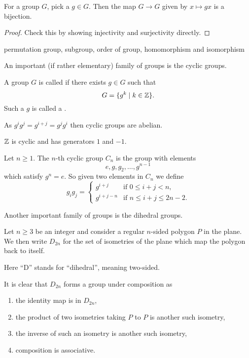 \begin{proposition}
For a group $G$, pick a $g \in G$. Then the map $G \to G$ given by $x \mapsto gx$ is a bijection.
\end{proposition}
\begin{proof}
Check this by showing injectivity and surjectivity directly.
\end{proof}

permutation group, subgroup, order of group, homomorphism and isomorphism

An important (if rather elementary) family of groups is the cyclic groups.

\begin{definition}
A group $G$ is called  if there exists $g\in G$ such that
\[ G=\{g^k\mid k\in\mathbb Z\}. \]
Such a $g$ is called a .
\end{definition}

As $g^ig^j=g^{i+j}=g^jg^i$ then cyclic groups are abelian.

\begin{example}
$\mathbb Z$ is cyclic and has generators $1$ and $-1$.
\end{example}

\begin{example}
Let $n\ge1$. The $n$-th cyclic group $C_n$ is the group with elements
\[ e, g, g_2, \dots, g^{n-1} \]
which satisfy $g^n=e$. So given two elements in $C_n$ we define
\[ g_ig_j=\begin{cases}
g^{i+j} & \text{if } 0\le i+j<n, \\
g^{i+j-n} & \text{if } n\le i+j\le 2n-2.
\end{cases} \]
\end{example}

Another important family of groups is the dihedral groups.

\begin{definition}
Let $n\ge3$ be an integer and consider a regular $n$-sided polygon $P$ in the plane. We then write $D_{2n}$ for the set of isometries of the plane which map the polygon back to itself.
\end{definition}

\begin{remark}
Here ``D'' stands for ``dihedral'', meaning two-sided.
\end{remark}

It is clear that $D_{2n}$ forms a group under composition as
\begin{enumerate}[label=(\roman*)]
\item the identity map is in $D_{2n}$,
\item the product of two isometries taking $P$ to $P$ is another such isometry,
\item the inverse of such an isometry is another such isometry,
\item composition is associative.
\end{enumerate}

